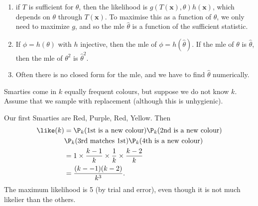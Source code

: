 \documentclass[a4paper]{article}
\begin{document}
\note
\begin{enumerate}
  \item if $T$ is sufficient for $\theta$, then the likelihood is $g(T(\mathbf{x}), \theta)h(\mathbf{x})$, which depends on $\theta$ through $T(\mathbf{x})$. To maximise this as a function of $\theta$, we only need to maximize $g$, and so the mle $\hat{\theta}$ is a function of the sufficient statistic.
  \item If $\phi = h(\theta)$ with $h$ injective, then the mle of $\phi =h(\hat{\theta})$. If the mle of $\theta$ is $\hat{\theta}$, then the mle of $\theta^2$ is $\hat{\theta}^2$.
  \item Often there is no closed form for the mle, and we have to find $\hat{\theta}$ numerically.
\end{enumerate}

\begin{eg}
  Smarties come in $k$ equally frequent colours, but suppose we do not know $k$. Assume that we sample with replacement (although this is unhygienic).

  Our first Smarties are Red, Purple, Red, Yellow. Then
  \begin{align*}
  \like(k)&=\P_k(\text{1st is a new colour})\P_k(\text{2nd is a new colour})\\\
  & \P_k(\text{3rd matches 1st})\P_k(\text{4th is a new colour})\\
  &= 1\times \frac{k - 1}{k}\times \frac{1}{k}\times \frac{k - 2}{k}\\
  &= \frac{(k- - 1)(k - 2)}{k^3}.
\end{align*}
The maximum likelihood is 5 (by trial and error), even though it is not much likelier than the others.
\end{eg}
\end{document}
